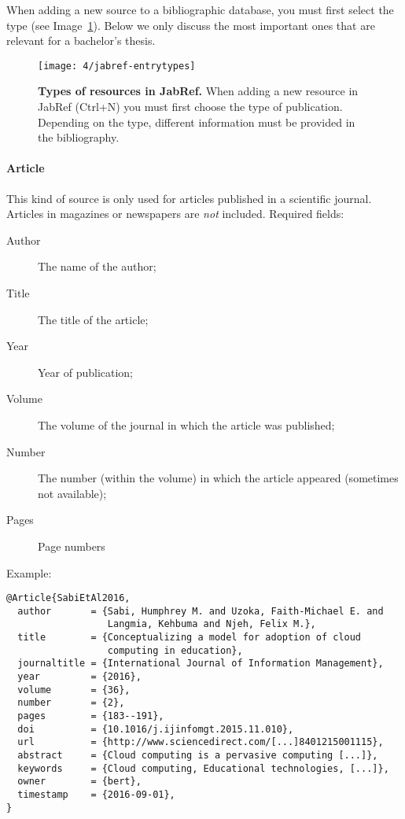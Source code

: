 When adding a new source to a bibliographic database, you must first select the type (see Image~\ref{fig:jabref-entrytypes}). Below we only discuss the most important ones that are relevant for a bachelor's thesis.

\begin{figure}
  \centering
  \texttt{[image: 4/jabref-entrytypes]}
  \caption[Types of resources in JabRef]{\textbf{Types of resources in JabRef.} When adding a new resource in JabRef (Ctrl+N) you must first choose the type of publication. Depending on the type, different information must be provided in the bibliography.}
  \label{fig:jabref-entrytypes}
\end{figure}

\paragraph{Article}

This kind of source is only used for articles published in a scientific journal. Articles in magazines or newspapers are \emph{not} included. Required fields:

\begin{description}
  \item[Author] The name of the author;
  \item[Title] The title of the article;
  \item[Year] Year of publication;
  \item[Volume] The volume of the journal in which the article was published;
  \item[Number] The number (within the volume) in which the article appeared (sometimes not available);
  \item[Pages] Page numbers
\end{description}

Example:
\begin{verbatim}
@Article{SabiEtAl2016,
  author       = {Sabi, Humphrey M. and Uzoka, Faith-Michael E. and
                  Langmia, Kehbuma and Njeh, Felix M.},
  title        = {Conceptualizing a model for adoption of cloud
                  computing in education},
  journaltitle = {International Journal of Information Management},
  year         = {2016},
  volume       = {36},
  number       = {2},
  pages        = {183--191},
  doi          = {10.1016/j.ijinfomgt.2015.11.010},
  url          = {http://www.sciencedirect.com/[...]8401215001115},
  abstract     = {Cloud computing is a pervasive computing [...]},
  keywords     = {Cloud computing, Educational technologies, [...]},
  owner        = {bert},
  timestamp    = {2016-09-01},
}
\end{verbatim}

